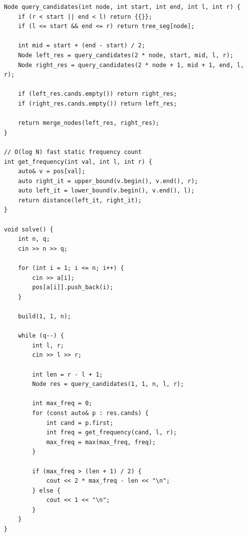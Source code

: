 \documentclass[9pt,a4paper,twocolumn]{extarticle}
\begin{document}
\begin{lstlisting}
Node query_candidates(int node, int start, int end, int l, int r) {
    if (r < start || end < l) return {{}};
    if (l <= start && end <= r) return tree_seg[node];

    int mid = start + (end - start) / 2;
    Node left_res = query_candidates(2 * node, start, mid, l, r);
    Node right_res = query_candidates(2 * node + 1, mid + 1, end, l, r);

    if (left_res.cands.empty()) return right_res;
    if (right_res.cands.empty()) return left_res;

    return merge_nodes(left_res, right_res);
}

// O(log N) fast static frequency count
int get_frequency(int val, int l, int r) {
    auto& v = pos[val];
    auto right_it = upper_bound(v.begin(), v.end(), r);
    auto left_it = lower_bound(v.begin(), v.end(), l);
    return distance(left_it, right_it);
}

void solve() {
    int n, q;
    cin >> n >> q;

    for (int i = 1; i <= n; i++) {
        cin >> a[i];
        pos[a[i]].push_back(i);
    }

    build(1, 1, n);

    while (q--) {
        int l, r;
        cin >> l >> r;

        int len = r - l + 1;
        Node res = query_candidates(1, 1, n, l, r);

        int max_freq = 0;
        for (const auto& p : res.cands) {
            int cand = p.first;
            int freq = get_frequency(cand, l, r);
            max_freq = max(max_freq, freq);
        }

        if (max_freq > (len + 1) / 2) {
            cout << 2 * max_freq - len << "\n";
        } else {
            cout << 1 << "\n";
        }
    }
}
\end{lstlisting}

\filbreak
\end{document}
